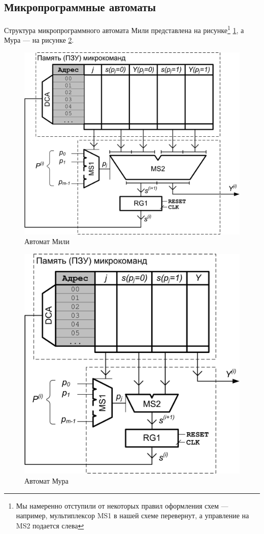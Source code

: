 \subsection{Микропрограммные автоматы}

Структура микропрограммного автомата Мили представлена на рисунке\footnote{Мы намеренно отступили от некоторых правил оформления схем --- например, мультиплексор MS1 в нашей схеме перевернут, а управление на MS2 подается слева} \ref{fig::ch::practice::Mili}, а Мура --- на рисунке \ref{fig::ch::practice::Moore}. 

\begin{figure}[!ht]
    \centering
    \includegraphics{fig/mili} 
    \caption{Автомат Мили}
    \label{fig::ch::practice::Mili}
\end{figure}

\begin{figure}[!ht]
    \centering
    \includegraphics{fig/moore}
    \caption{Автомат Мура}
    \label{fig::ch::practice::Moore}
\end{figure}

